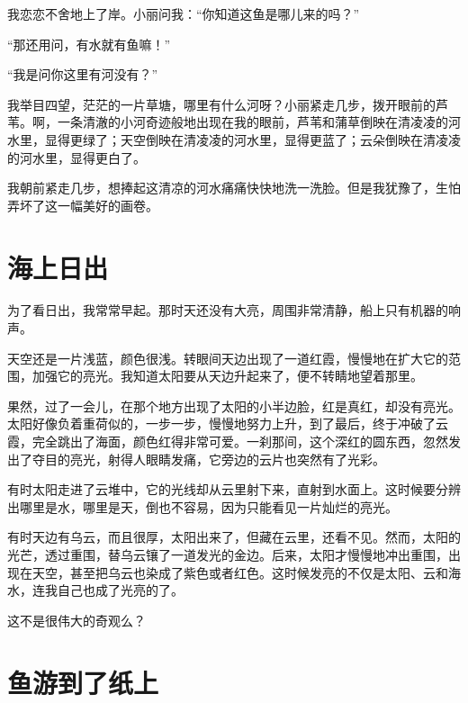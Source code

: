 \documentclass[12pt,UTF-8,openany]{ctexbook}
\begin{document}
\begin{large}
    我恋恋不舍地上了岸。小丽问我：“你知道这鱼是哪儿来的吗？”
    
    “那还用问，有水就有鱼嘛！”
    
    “我是问你这里有河没有？”
    
    我举目四望，茫茫的一片草塘，哪里有什么河呀？小丽紧走几步，拨开眼前的芦苇。啊，一条清澈的小河奇迹般地出现在我的眼前，芦苇和蒲草倒映在清凌凌的河水里，显得更绿了；天空倒映在清凌凌的河水里，显得更蓝了；云朵倒映在清凌凌的河水里，显得更白了。
    
    我朝前紧走几步，想捧起这清凉的河水痛痛快快地洗一洗脸。但是我犹豫了，生怕弄坏了这一幅美好的画卷。
    
\end{large}



\chapter{海上日出}

\begin{large}
    
    为了看日出，我常常早起。那时天还没有大亮，周围非常清静，船上只有机器的响声。
    
    天空还是一片浅蓝，颜色很浅。转眼间天边出现了一道红霞，慢慢地在扩大它的范围，加强它的亮光。我知道太阳要从天边升起来了，便不转睛地望着那里。
    
    果然，过了一会儿，在那个地方出现了太阳的小半边脸，红是真红，却没有亮光。太阳好像负着重荷似的，一步一步，慢慢地努力上升，到了最后，终于冲破了云霞，完全跳出了海面，颜色红得非常可爱。一刹那间，这个深红的圆东西，忽然发出了夺目的亮光，射得人眼睛发痛，它旁边的云片也突然有了光彩。
    
    有时太阳走进了云堆中，它的光线却从云里射下来，直射到水面上。这时候要分辨出哪里是水，哪里是天，倒也不容易，因为只能看见一片灿烂的亮光。
    
    有时天边有乌云，而且很厚，太阳出来了，但藏在云里，还看不见。然而，太阳的光芒，透过重围，替乌云镶了一道发光的金边。后来，太阳才慢慢地冲出重围，出现在天空，甚至把乌云也染成了紫色或者红色。这时候发亮的不仅是太阳、云和海水，连我自己也成了光亮的了。
    
    这不是很伟大的奇观么？
    
\end{large}



\chapter{鱼游到了纸上}
\end{document}

